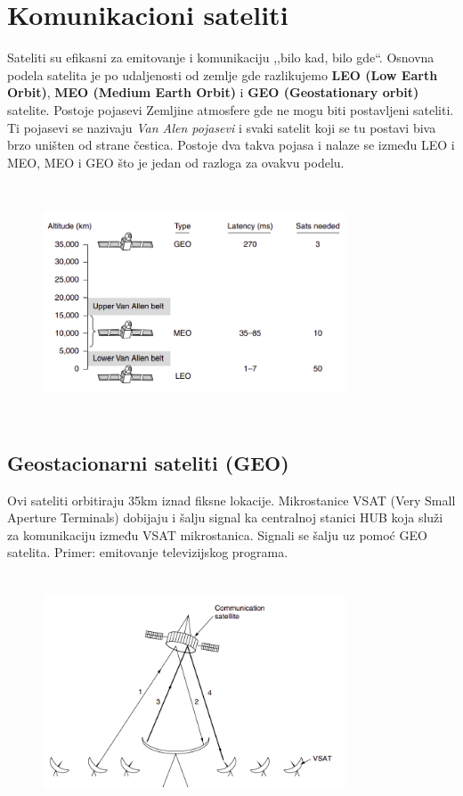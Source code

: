 \documentclass[a4paper]{article}
\begin{document}
\section{Komunikacioni sateliti}
        Sateliti su efikasni za emitovanje i komunikaciju ,,bilo kad, bilo gde``. Osnovna podela
        satelita je po udaljenosti od zemlje gde razlikujemo \textbf{LEO (Low Earth Orbit)}, 
        \textbf{MEO (Medium Earth Orbit)} i \textbf{GEO (Geostationary orbit)} satelite. Postoje
        pojasevi Zemljine atmosfere gde ne mogu biti postavljeni sateliti. Ti pojasevi se nazivaju
        \textit{Van Alen pojasevi} i svaki satelit koji se tu postavi biva brzo uništen od strane čestica.
        Postoje dva takva pojasa i nalaze se između LEO i MEO, MEO i GEO što je jedan od 
        razloga za ovakvu podelu.
        \begin{figure}[H]
            \begin{center}
                \includegraphics[width=90mm,height=70mm]{Slike/sateliti.png}
            \end{center}
        \end{figure}
        \subsection{Geostacionarni sateliti (GEO)}
            Ovi sateliti orbitiraju 35km iznad fiksne lokacije. Mikrostanice VSAT (Very Small 
            Aperture Terminals) dobijaju i šalju signal ka centralnoj stanici HUB koja služi 
            za komunikaciju između VSAT mikrostanica. Signali se šalju uz pomoć GEO satelita.
            Primer: emitovanje televizijskog programa.
            \begin{figure}[H]
                \begin{center}
                    \includegraphics[width=90mm,height=70mm]{Slike/geo.png}
                \end{center}
            \end{figure}
\end{document}
